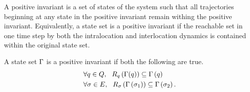 A positive invariant is a set of states of the system such
that all trajectories beginning at any state in the positive invariant
remain withing the positive invariant.  Equivalently, a state set
is a positive invariant if the reachable set in one time step by
both the intralocation and interlocation dynamics is contained within the
original state set.
\begin{definition}
A state set $\Gamma$ is a positive invariant if
both the following are true.
\begin{align}~\label{eqn:PosInv}
& \forall q\in Q,~~R_{q}\left(\Gamma(q)\right) \subseteq \Gamma\left(q\right)\\
& \forall\sigma\in E,~~R_{\sigma}\left(\Gamma\left(\sigma_{1}\right)\right) \subseteq
  \Gamma\left(\sigma_{2}\right).
\end{align}
\end{definition}
